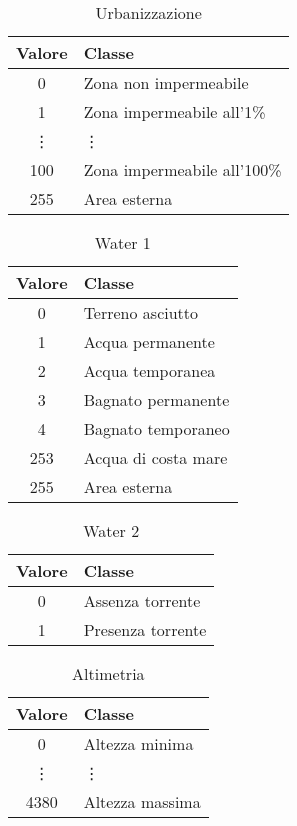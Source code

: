 \documentclass[draft]{article}
\begin{document}
\begin{table}
\centering
\begin{tabular}{|c|l|}
\hline
\textbf{Valore} & \textbf{Classe}\\
\hline
0 & Zona non impermeabile\\
1 & Zona impermeabile all'1\%\\
\vdots & \vdots\\
100 & Zona impermeabile all'100\%\\
255 & Area esterna\\
\hline
\end{tabular}
\caption{Urbanizzazione}
\label{tab:urbanization}
\end{table}

\begin{table}
\centering
\begin{tabular}{|c|l|}
\hline
\textbf{Valore} & \textbf{Classe}\\
\hline
0 & Terreno asciutto\\
1 & Acqua permanente\\
2 & Acqua temporanea\\
3 & Bagnato permanente\\
4 & Bagnato temporaneo\\
253 & Acqua di costa mare\\
255 & Area esterna\\
\hline
\end{tabular}
\caption{Water 1}
\label{tab:water1}
\end{table}

\begin{table}
\centering
\begin{tabular}{|c|l|}
\hline
\textbf{Valore} & \textbf{Classe}\\
\hline
0 & Assenza torrente\\
1 & Presenza torrente\\
\hline
\end{tabular}
\caption{Water 2}
\label{tab:water2}
\end{table}

\begin{table}
\centering
\begin{tabular}{|c|l|}
\hline
\textbf{Valore} & \textbf{Classe}\\
\hline
0 & Altezza minima\\
\vdots & \vdots\\
4380 & Altezza massima\\
\hline
\end{tabular}
\caption{Altimetria}
\label{tab:altimetry}
\end{table}



\end{document}
